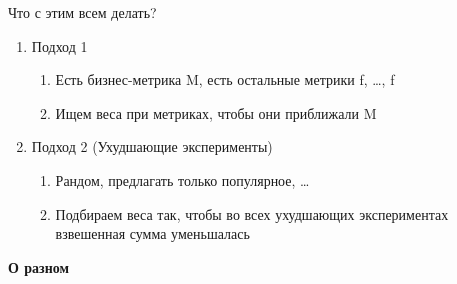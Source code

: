 \documentclass[a4paper, 12pt]{article}
\begin{document}
\begin{enumerate}
\begin{enumerate}
    Что с этим всем делать?
    

    \begin{enumerate}
    \def\labelenumiii{\roman{enumiii}.}
    \item
      
      Подход 1
      

      \begin{enumerate}
      \def\labelenumiv{\arabic{enumiv}.}
      \item
        
        Есть бизнес-метрика M, есть остальные метрики f, \ldots{}, f
        
      \item
        
        Ищем веса при метриках, чтобы они приближали M
        
      \end{enumerate}
    \item
      
      Подход 2 (Ухудшающие эксперименты)
      

      \begin{enumerate}
      \def\labelenumiv{\arabic{enumiv}.}
      \item
        
        Рандом, предлагать только популярное, \ldots{}
        
      \item
        
        Подбираем веса так, чтобы во всех ухудшающих экспериментах
        взвешенная сумма уменьшалась
        
      \end{enumerate}
    \end{enumerate}
  \end{enumerate}
\end{enumerate}

\textbf{О разном}
\end{document}
